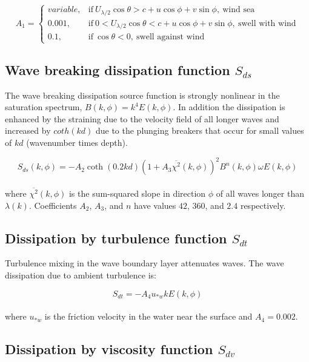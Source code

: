 \documentclass[letterpaper]{article}
\numberwithin{equation}{section}
\begin{document}
\begin{equation}
  A_{1}=
  \begin{cases}
    variable, & \text{if}\ U_{\lambda/2}\cos{\theta}>c+u\cos{\phi}+v\sin{\phi},\   \text{wind sea} \\
    0.001, & \text{if}\ 0<U_{\lambda/2}\cos{\theta}<c+u\cos{\phi}+v\sin{\phi},\ \text{swell with wind} \\
    0.1,  & \text{if}\ \cos{\theta}<0,\   \text{swell against wind} 
  \end{cases}
\label{sin2}
\end{equation}

\subsection{Wave breaking dissipation function $S_{ds}$}

The wave breaking dissipation source function is strongly nonlinear 
in the saturation spectrum, $B(k,\phi)=k^{4}E(k,\phi)$. 
In addition the dissipation is enhanced by the straining due to the velocity field of all longer waves 
and increased by $coth(kd)$ due to the plunging breakers that occur for small values of $kd$ (wavenumber times depth). 

\begin{equation}
S_{ds}(k,\phi)=-A_{2}\coth(0.2kd)\left(1+A_{3}\overline{\chi^{2}}(k,\phi)\right)^{2}B^{n}(k,\phi)\omega E(k,\phi) 
\label{sds}
\end{equation}
\\
where $\overline{\chi^{2}}(k,\phi)$ is the sum-squared slope in direction $\phi$ of all waves longer than $\lambda(k)$.
Coefficients $A_{2}$, $A_{3}$, and $n$ have values $42$, $360$, and $2.4$ respectively.

\subsection{Dissipation by turbulence function $S_{dt}$}

Turbulence mixing in the wave boundary layer attenuates waves. The wave dissipation due to ambient turbulence is:

\begin{equation}
S_{dt} = -A_{4} u_{*w}k E(k,\phi)
\label{sdt} 
\end{equation}
\\
where $u_{*w}$ is the friction velocity in the water near the surface and $A_{4} = 0.002$.

\subsection{Dissipation by viscosity function $S_{dv}$}
\end{document}
